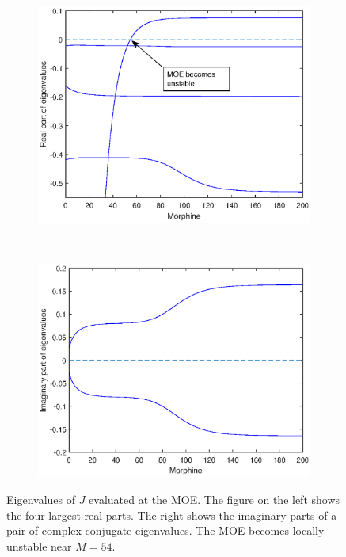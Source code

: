 \documentclass[11pt, oneside]{article}    %
\begin{document}
\vspace{5mm}

\begin{figure}[h]
    \centering
    \begin{subfigure}[b]{0.5\textwidth}
        \centering
        \includegraphics[scale=0.55]{MOE_some_eigs.eps}
    \end{subfigure}%
    ~ 
    \begin{subfigure}[b]{0.5\textwidth}
        \centering
        \includegraphics[scale=0.55]{imag_parts.eps}
    \end{subfigure}
    \caption{Eigenvalues of $J$ evaluated at the MOE. The figure on the left shows the four largest real parts. The right shows the imaginary parts of a pair of complex conjugate eigenvalues. The MOE becomes locally unstable near $M=54$.}
\label{fig:MOE_eigs}
\end{figure}
\end{document}
